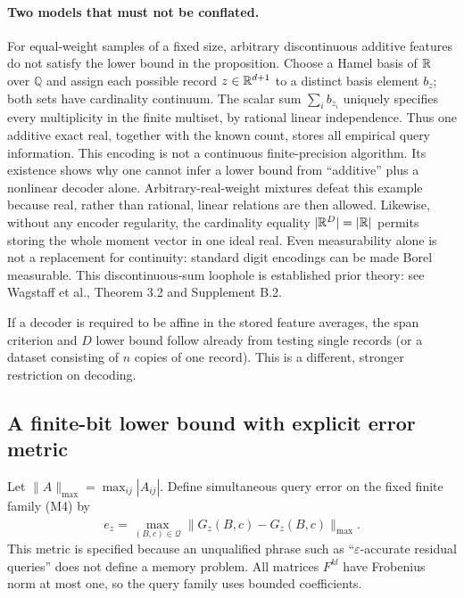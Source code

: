 \paragraph{Two models that must not be conflated.}
For equal-weight samples of a fixed size, arbitrary discontinuous
additive features do not satisfy the lower bound in the proposition.
Choose a Hamel basis of $\mathbb R$ over $\mathbb Q$ and assign each possible
record $z\in\mathbb R^{d+1}$ to a distinct basis element $b_z$; both sets
have cardinality continuum. The scalar sum $\sum_i b_{z_i}$ uniquely
specifies every multiplicity in the finite multiset, by rational
linear independence. Thus one additive exact real, together with the
known count, stores all empirical query information. This encoding is
not a continuous finite-precision algorithm. Its existence shows why
one cannot infer a lower bound from ``additive'' plus a nonlinear
decoder alone. Arbitrary-real-weight mixtures defeat this example
because real, rather than rational, linear relations are then allowed.
Likewise, without any encoder regularity, the cardinality equality
$|\mathbb R^D|=|\mathbb R|$ permits storing the whole moment vector in one ideal
real. Even measurability alone is not a replacement for continuity:
standard digit encodings can be made Borel measurable.
This discontinuous-sum loophole is established prior theory: see
Wagstaff et al., Theorem 3.2 and Supplement B.2\cite{wagstaff}.

If a decoder is required to be affine in the stored feature averages,
the span criterion and $D$ lower bound follow already from testing
single records (or a dataset consisting of $n$ copies of one record).
This is a different, stronger restriction on decoding.

\subsection{A finite-bit lower bound with explicit error metric}

Let $\|A\|_{\max}=\max_{ij}|A_{ij}|$. Define simultaneous query error
on the fixed finite family (M4) by
\[
 e_z=\max_{(B,c)\in\mathcal Q}
       \|\widehat G_z(B,c)-G_z(B,c)\|_{\max}.\tag{M6}
\]
This metric is specified because an unqualified phrase such as
``$\varepsilon$-accurate residual queries'' does not define a memory
problem. All matrices $F^{kl}$ have Frobenius norm at most one, so
the query family uses bounded coefficients.

